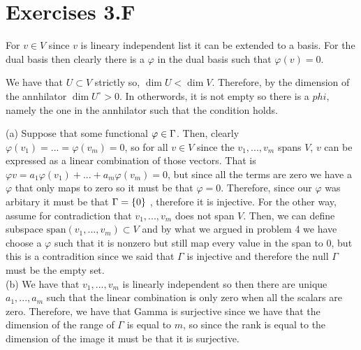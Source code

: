 \documentclass[10pt, twocolumn]{article}
\newcommand{\vspan}[1]{\text{span}\left(#1\right)}
\newcommand{\nul}{\text{null }}
\begin{document}
\section{Exercises 3.F}
\begin{q}[3]
    For $ v \in V $ since $ v $ is lineary independent list it can be extended to a basis. For the dual basis then clearly there is a $ \varphi $ in the dual basis such that $ \varphi(v) = 0 $.
\end{q}
\begin{q}[4]
    We have that $ U \subset V $ strictly so, $ \dim U < \dim V $. 
    Therefore, by the dimension of the annhilator 
    $ \dim U^{\circ} > 0 $. 
    In otherwords, it is not empty so there is a $ phi $, namely the one in the annhilator such that the condition holds.
\end{q}
\begin{q}[6]
    (a) Suppose that some functional $ \varphi \in \null \Gamma $. 
    Then, clearly $ \varphi (v_1) = ... = \varphi (v_m) = 0 $, so for all $ v \in V $ since the $ v_1 , ..., v_m $ spans $ V $, $ v $ can be expressed as a linear combination of those vectors. 
    That is $ \varphi v = a_1 \varphi(v_1)+ ... + a_m \varphi(v_m) = 0 $, but since all the terms are zero we have a $ \varphi $ that only maps to zero so it must be that $ \varphi = 0$. 
    Therefore, since our $ \varphi $ was arbitary it must be that $ \null \Gamma = \{0\} $ , therefore it is injective.
    For the other way, assume for contradiction that $ v_1, ..., v_m $ does not span  $ V $. 
    Then, we can define subspace $ \vspan{v_1, ..., v_m} \subset V $ and by what we argued in problem 4 we have choose a $ \varphi $ such that it is nonzero but still map every value in the span to 0, but this is a contradition since we said that $ \Gamma $ is injective and therefore the $ \nul \Gamma $ must be the empty set. \\
    (b) We have that $ v_1, ..., v_m $ is linearly independent so then there are unique $ a_1, ..., a_m $ such that the linear combination is only zero when all the scalars are zero.
    Therefore, we have that Gamma is surjective since we have that the dimension of the range of $ \Gamma $ is equal to $ m $, 
    so since the rank is equal to the dimension of the image it must be that it is surjective.
\end{q}
    
\end{document}
